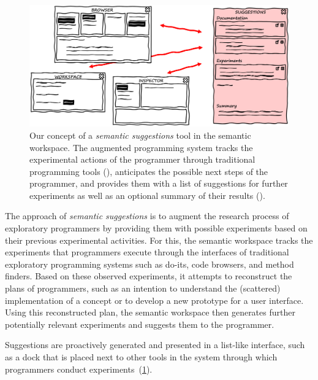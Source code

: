 \begin{figure}
	\centering
	\includegraphics[width=\textwidth]{02_workspace/suggestions.png}
	\caption[Our concept of a \emph{semantic suggestions} tool in the semantic workspace.]{
		Our concept of a \emph{semantic suggestions} tool in the semantic workspace.
		The augmented programming system tracks the experimental actions of the programmer through traditional programming tools (\bold{\textcolor{gray}{gray}}), anticipates the possible next steps of the programmer, and provides them with a list of suggestions for further experiments as well as an optional summary of their results (\bold{\textcolor[HTML]{c00000}{red}}).
	}
	\label{fig:approach/workspace/suggestions}
\end{figure}

The approach of \emph{semantic suggestions} is to augment the research process of exploratory programmers by providing them with possible experiments based on their previous experimental activities.
For this, the semantic workspace tracks the experiments that programmers execute through the interfaces of traditional exploratory programming systems such as do-its, code browsers, and method finders.
Based on these observed experiments, it attempts to reconstruct the plans of programmers, such as an intention to understand the (scattered) implementation of a concept or to develop a new prototype for a user interface.
Using this reconstructed plan, the semantic workspace then generates further potentially relevant experiments and suggests them to the programmer.

Suggestions are proactively generated and presented in a list-like interface, such as a dock that is placed next to other tools in the system through which programmers conduct experiments~(\cref{fig:approach/workspace/suggestions}).

